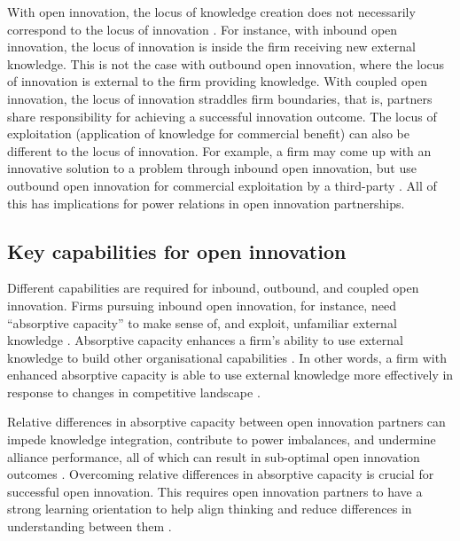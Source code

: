  With open innovation, the locus of knowledge creation does not necessarily correspond to the locus of innovation \citep{gassmann2004towards}. For instance, with inbound open innovation, the locus of innovation is inside the firm receiving new external knowledge. This is not the case with outbound open innovation, where the locus of innovation is external to the firm providing knowledge. With coupled open innovation, the locus of innovation straddles firm boundaries, that is, partners share responsibility for achieving a successful innovation outcome. The locus of exploitation (application of knowledge for commercial benefit) can also be different to the locus of innovation. For example, a firm may come up with an innovative solution to a problem through inbound open innovation, but use outbound open innovation for commercial exploitation by a third-party \citep{gassmann2004towards}. All of this has implications for power relations in open innovation partnerships. \medskip

\subsection{Key capabilities for open innovation}

Different capabilities are required for inbound, outbound, and coupled open innovation. Firms pursuing inbound open innovation, for instance, need \enquote{absorptive capacity} to make sense of, and exploit, unfamiliar external knowledge  \citep{vanhaverbeke2007connecting}. Absorptive capacity enhances a firm’s ability to use external knowledge to build other organisational capabilities \citep{zahra2002absorptive,ambrosini2009dynamic,sun2010examination}. In other words, a firm with enhanced absorptive capacity is able to use external knowledge more effectively in response to changes in competitive landscape \citep{chen2009positive,vasylieva2013absorptive,de2016knowledge}. \medskip

Relative differences in absorptive capacity between open innovation partners can impede knowledge integration, contribute to power imbalances, and undermine alliance performance, all of which can result in sub-optimal open innovation outcomes \citep{lane1998relative,vanhaverbeke2007connecting,zobel2016benefiting,tell2017managing}. Overcoming relative differences in absorptive capacity is crucial for successful open innovation. This requires open innovation partners to have a strong learning orientation to help align thinking and reduce differences in understanding between them  \citep{nooteboom2000learning,sun2010examination,de2016knowledge}. \medskip

